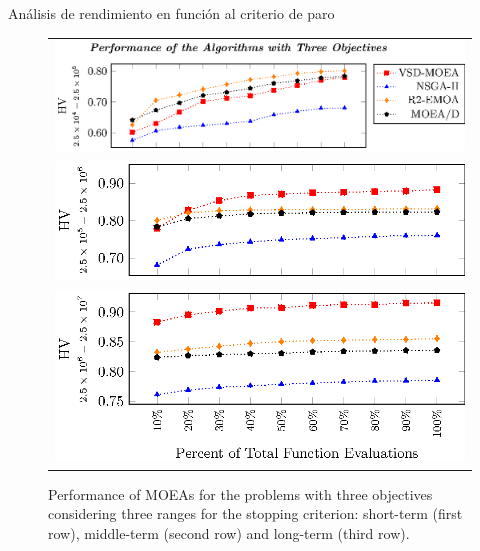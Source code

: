 \documentclass{beamer}
\begin{document}
\begin{frame}{Análisis de rendimiento en función al criterio de paro}
\begin{figure}[t]
\centering
\begin{tabular}{l}
 \includegraphics[scale=0.6]{Images/Time_tikz-figure3.eps}\\[0cm]%
 \includegraphics[scale=0.6]{Images/Time_tikz-figure4.eps}\\[0cm]%
 \includegraphics[scale=0.6]{Images/Time_tikz-figure5.eps}
\end{tabular}
\caption{\scriptsize Performance of MOEAs for the problems with three objectives considering three ranges for the stopping 
criterion: short-term (first row), middle-term (second row) and long-term (third row).}
\end{figure}
\end{frame}
\end{document}
